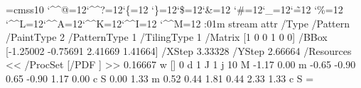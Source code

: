 \font\THFa=cmss10
\begingroup
\catcode`\^^@=12\catcode`\^^?=12\catcode`\{=12
\catcode`\}=12\catcode`\$=12\catcode`\&=12
\catcode`\#=12\catcode`\_=12\catcode`\~=12
\catcode`\%=12
\catcode`\^^L=12\catcode`\^^A=12\catcode`\^^K=12\catcode`\^^I=12
\catcode`\^^M=12
\THFa:01m\endinclude\endgroup
\immediate\pdfobj stream attr {/Type /Pattern
/PaintType 2 /PatternType 1 /TilingType 1
/Matrix [1 0 0 1 0 0]
/BBox [-1.25002 -0.75691 2.41669 1.41664]
/XStep 3.33328
/YStep 2.66664
/Resources << /ProcSet [/PDF ] >> } {
0.16667 w
[] 0 d
1 J
1 j
10 M
-1.17 0.00 m
-0.65 -0.90 0.65 -0.90 1.17 0.00 c
S
0.00 1.33 m
0.52 0.44 1.81 0.44 2.33 1.33 c
S
} \newcount \THPa\THPa=\pdflastobj
